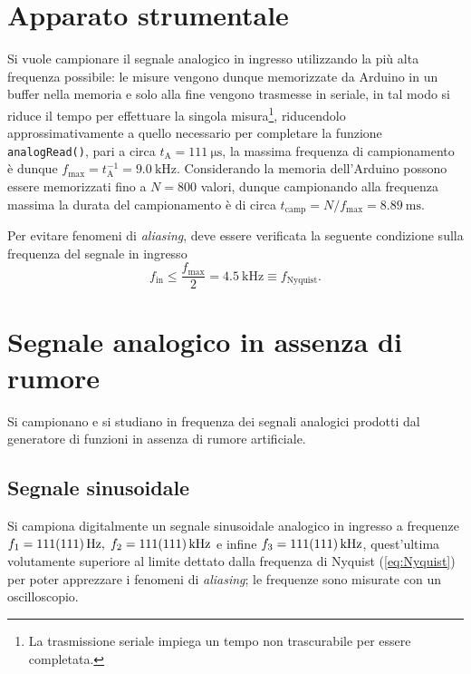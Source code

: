 \documentclass[10pt,oneside,a4paper]{article}
\begin{document}
\begin{multicols}{2}
\section{Apparato strumentale}
Si vuole campionare il segnale analogico in ingresso utilizzando la più alta frequenza possibile: le misure vengono dunque memorizzate da Arduino in un buffer nella memoria e solo alla fine vengono trasmesse in seriale, in tal modo si riduce il tempo per effettuare la singola misura\footnote{La trasmissione seriale impiega un tempo non trascurabile per essere completata.}, riducendolo approssimativamente a quello necessario per completare la funzione \texttt{analogRead()}, pari a circa $t_\text{A} = \SI{111}{\micro\second}$, la massima frequenza di campionamento è dunque $f_\text{max} = t_\text{A}^{-1} = \SI{9.0}{\kilo\hertz}$. Considerando la memoria dell'Arduino possono essere memorizzati fino a $N = 800$ valori, dunque campionando alla frequenza massima la durata del campionamento è di circa $t_\text{camp} = N/f_\text{max} = \SI{8.89}{\milli\second}$.

Per evitare fenomeni di \emph{aliasing}, deve essere verificata la seguente condizione sulla frequenza del segnale in ingresso
\begin{equation}\label{eq:Nyquist}
	f_\text{in} \leq \frac{f_\text{max}}{2} = \SI{4.5}{\kilo\hertz} \equiv f_\text{Nyquist}.
\end{equation}


\section{Segnale analogico in assenza di rumore}
Si campionano e si studiano in frequenza dei segnali analogici prodotti dal generatore di funzioni in assenza di rumore artificiale.
\subsection{Segnale sinusoidale}
Si campiona digitalmente un segnale sinusoidale analogico in ingresso a frequenze $f_1 = \SI{111 \pm 111}{\hertz}, \; f_2 = \SI{111 \pm 111}{\kilo\hertz}$ e infine $f_3 = \SI{111 \pm 111}{\kilo\hertz}$, quest'ultima volutamente superiore al limite dettato dalla frequenza di Nyquist (\ref{eq:Nyquist}) per poter apprezzare i fenomeni di \emph{aliasing}; le frequenze sono misurate con un oscilloscopio.


\end{multicols}
\end{document}

